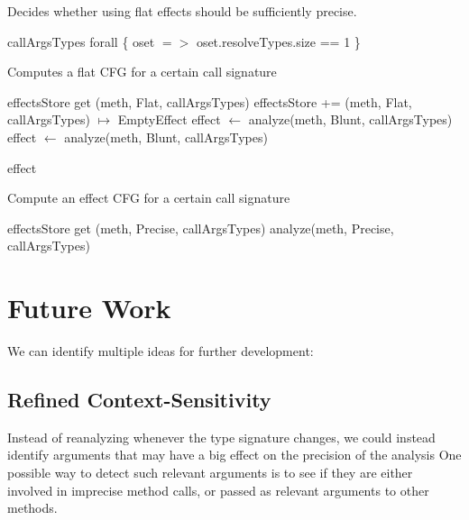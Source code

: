 \documentclass[a4paper]{article}
\begin{document}
\begin{algorithm}
\caption{Decides whether using flat effects should be sufficiently
precise.}\label{algo:pt:shouldwe}
\begin{algorithmic}[1]
    \State \Return callArgsTypes forall \{ oset $=>$ oset.resolveTypes.size == 1 \}
\EndFunction
\end{algorithmic}
\end{algorithm}

\begin{algorithm}
\caption{Computes a flat CFG for a certain call signature}\label{algo:pt:getflatcfg}
\begin{algorithmic}[1]
        \State \Return effectsStore get (meth, Flat, callArgsTypes)
    \Else
        \State effectsStore += (meth, Flat, callArgsTypes) $\mapsto$ EmptyEffect
        \State effect $\gets$ analyze(meth, Blunt, callArgsTypes)
        \Repeat
            \State effect $\gets$ analyze(meth, Blunt, callArgsTypes)

        \State \Return effect
    \EndIf
\EndFunction
\end{algorithmic}
\end{algorithm}

\begin{algorithm}
\caption{Compute an effect CFG for a certain call signature}\label{algo:pt:getanalyzedcfg}
\begin{algorithmic}[1]
        \State \Return effectsStore get (meth, Precise, callArgsTypes)
    \Else
        \State \Return analyze(meth, Precise, callArgsTypes)
    \EndIf
\EndFunction
\end{algorithmic}
\end{algorithm}


\FloatBarrier

\section{Future Work}
We can identify multiple ideas for further development:

\subsection{Refined Context-Sensitivity}
Instead of reanalyzing whenever the type signature changes, we could instead
identify arguments that may have a big effect on the precision of the analysis
One possible way to detect such relevant arguments is to see if they are either
involved in imprecise method calls, or passed as relevant arguments to other
methods.
\end{document}
